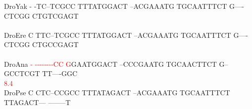 \documentclass[11pt,twoside,reqno,a4paper]{article}
\begin{document}
{DroYak	-	-TC--TCGCC	TTTATGGACT	--ACGAAATG	TGCAATTTCT	G----CTCGG	CTGTCGAGT\\
\hspace*{7\charwidth}\hspace*{1\charwidth}\hspace*{1\charwidth}\hspace*{1\charwidth}\hspace*{1\charwidth}\hspace*{1\charwidth}\hspace*{1\charwidth}\\
DroEre	C	TTC--TCGCC	TTTATGGACT	--ACGAAATG	TGCAATTTCT	G----CTCGG	CTGCCGAGT\\
\hspace*{7\charwidth}\hspace*{1\charwidth}\hspace*{1\charwidth}\hspace*{1\charwidth}\hspace*{1\charwidth}\hspace*{1\charwidth}\hspace*{1\charwidth}\\
DroAna	\textcolor{Red}{-}	\textcolor{Red}{-}\textcolor{Red}{-}\textcolor{Red}{-}\textcolor{Red}{-}\textcolor{Red}{-}\textcolor{Red}{-}\textcolor{Red}{-}\textcolor{Red}{-}\textcolor{Red}{C}\textcolor{Red}{C}	\textcolor{Red}{G}GAATGGACT	--CCCGAATG	TGCAACTTCT	G--GCCTCGT	TT----GGC\\
\hspace*{7\charwidth}\hspace*{0\charwidth}\textcolor{Red}{8.4}\hspace*{1\charwidth}\hspace*{1\charwidth}\hspace*{1\charwidth}\hspace*{1\charwidth}\hspace*{1\charwidth}\hspace*{1\charwidth}\\
DroPse	C	CTC--CCGCC	TTTATAGACT	--ACGAAATG	TGCAATTTCT	TTAGACT---	--------T\\
\hspace*{7\charwidth}\hspace*{1\charwidth}\hspace*{1\charwidth}\hspace*{1\charwidth}\hspace*{1\charwidth}\hspace*{1\charwidth}\hspace*{1\charwidth}\\
}
\end{document}
